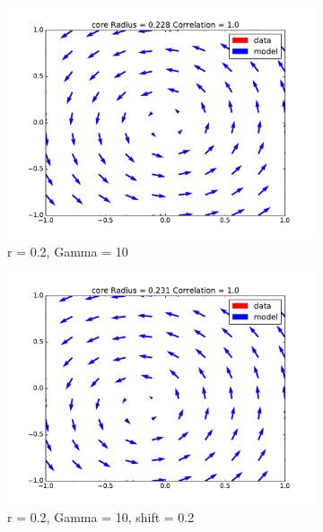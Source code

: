\documentclass[12pt, a4paper, openany]{memoir}
\begin{document}
\begin{figure}[h!]
	\centering
	\begin{subfigure}[b]{0.45\textwidth}
		\centering
		\includegraphics[trim=40 20 40 20 ,clip, width=\textwidth]{figure/test_02_10.pdf}
		\caption{r = 0.2, Gamma = 10}
	\end{subfigure}
	\begin{subfigure}[b]{0.45\textwidth}
		\centering
		\includegraphics[trim=40 20 40 20 ,clip, width=\textwidth]{figure/test_02_10_02.pdf}
		\caption{r = 0.2, Gamma = 10, shift = 0.2}
	\end{subfigure}
	\begin{subfigure}[b]{0.45\textwidth}
		\centering

\end{subfigure}
\end{figure}
\end{document}
